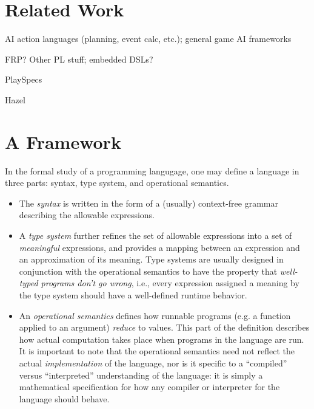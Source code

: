 \documentclass[sigconf]{acmart}
\begin{document}
\section{Related Work}

AI action languages (planning, event calc, etc.); general game AI frameworks

FRP? Other PL stuff; embedded DSLs?

PlaySpecs

Hazel

\section{A Framework}



  In the formal study of a programming langugage, one may define a language
  in three parts: syntax, type system, and operational semantics.
  \begin{itemize}
    \item The {\em syntax} is written in the form of a (usually)
      context-free grammar describing the allowable expressions.
    \item A {\em type system} further refines the set of allowable
      expressions into a set of {\em meaningful} expressions, and provides
      a mapping between an expression and an approximation of its meaning.
      Type systems are usually designed in conjunction with the operational
      semantics to have the property that {\em well-typed programs don't go
      wrong}, i.e., every expression assigned a meaning by the type system
      should have a well-defined runtime behavior.
    \item An {\em operational semantics} defines how runnable programs
      (e.g. a function applied to an argument) {\em reduce} to values. This
      part of the definition describes how actual computation takes place
      when programs in the language are run. It is important to note that
      the operational semantics need not reflect the actual {\em
      implementation} of the language, nor is it specific to a ``compiled''
      versus ``interpreted'' understanding of the language: it is simply a
      mathematical specification for how any compiler or interpreter for
      the language should behave.
  \end{itemize}
  
\end{document}
